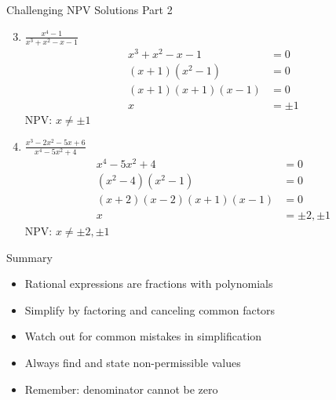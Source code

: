 \documentclass[aspectratio=169]{beamer}
\begin{document}
\begin{frame}{Challenging NPV Solutions Part 2}
\begin{tcolorbox}[colback=lightgray,colframe=accent,title=Detailed Solutions]
\footnotesize
\begin{enumerate}
  \setcounter{enumi}{2}
  \item $\frac{x^4 - 1}{x^3 + x^2 - x - 1}$
  \begin{align*}
    x^3 + x^2 - x - 1 &= 0 \\
    (x+1)(x^2-1) &= 0 \\
    (x+1)(x+1)(x-1) &= 0 \\
    x &= \pm 1
  \end{align*}
  NPV: $x \neq \pm 1$

  \item $\frac{x^3 - 2x^2 - 5x + 6}{x^4 - 5x^2 + 4}$
  \begin{align*}
    x^4 - 5x^2 + 4 &= 0 \\
    (x^2-4)(x^2-1) &= 0 \\
    (x+2)(x-2)(x+1)(x-1) &= 0 \\
    x &= \pm 2, \pm 1
  \end{align*}
  NPV: $x \neq \pm 2, \pm 1$
\end{enumerate}
\end{tcolorbox}
\end{frame}

\begin{frame}{Summary}
\begin{tcolorbox}[colback=lightgray,colframe=primary,title=Key Points]
\footnotesize
\begin{itemize}
  \item Rational expressions are fractions with polynomials
  \item Simplify by factoring and canceling common factors
  \item Watch out for common mistakes in simplification
  \item Always find and state non-permissible values
  \item Remember: denominator cannot be zero
\end{itemize}
\end{tcolorbox}
\end{frame}
\end{document}
